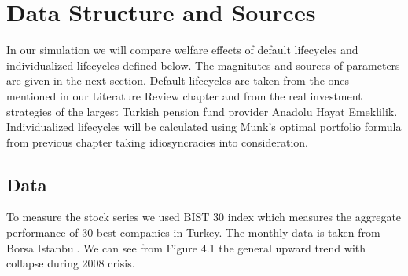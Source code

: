 \chapter{Data Structure and Sources}
\label{data}

In our simulation we will compare welfare effects of default lifecycles and individualized lifecycles defined below. The magnitutes and sources of parameters are given in the next section. Default lifecycles are taken from the ones mentioned in our Literature Review chapter and from the real investment strategies of the largest Turkish pension fund provider Anadolu Hayat Emeklilik. Individualized lifecycles will be calculated using Munk's optimal portfolio formula from previous chapter taking idiosyncracies into consideration.

\section{Data}

To measure the stock series we used BIST 30 index which measures the aggregate performance of 30 best companies in Turkey. The monthly data is taken from Borsa Istanbul. We can see from Figure 4.1 the general upward trend with collapse during 2008 crisis.

